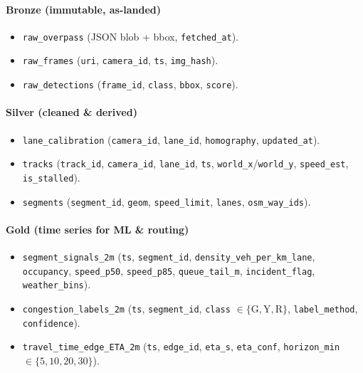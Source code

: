 \paragraph{Bronze (immutable, as-landed)}
\begin{itemize}
  \item \texttt{raw\_overpass} (JSON blob + bbox, \texttt{fetched\_at}).
  \item \texttt{raw\_frames} (\texttt{uri}, \texttt{camera\_id}, \texttt{ts}, \texttt{img\_hash}).
  \item \texttt{raw\_detections} (\texttt{frame\_id}, \texttt{class}, \texttt{bbox}, \texttt{score}).
\end{itemize}

\paragraph{Silver (cleaned \& derived)}
\begin{itemize}
  \item \texttt{lane\_calibration} (\texttt{camera\_id}, \texttt{lane\_id}, \texttt{homography}, \texttt{updated\_at}).
  \item \texttt{tracks} (\texttt{track\_id}, \texttt{camera\_id}, \texttt{lane\_id}, \texttt{ts}, \texttt{world\_x}/\texttt{world\_y}, \texttt{speed\_est}, \texttt{is\_stalled}).
  \item \texttt{segments} (\texttt{segment\_id}, \texttt{geom}, \texttt{speed\_limit}, \texttt{lanes}, \texttt{osm\_way\_ids}).
\end{itemize}

\paragraph{Gold (time series for ML \& routing)}
\begin{itemize}
  \item \texttt{segment\_signals\_2m} (\texttt{ts}, \texttt{segment\_id}, \texttt{density\_veh\_per\_km\_lane}, \texttt{occupancy}, \texttt{speed\_p50}, \texttt{speed\_p85}, \texttt{queue\_tail\_m}, \texttt{incident\_flag}, \texttt{weather\_bins}).
  \item \texttt{congestion\_labels\_2m} (\texttt{ts}, \texttt{segment\_id}, \texttt{class} $\in \{\text{G},\text{Y},\text{R}\}$, \texttt{label\_method}, \texttt{confidence}).
  \item \texttt{travel\_time\_edge\_ETA\_2m} (\texttt{ts}, \texttt{edge\_id}, \texttt{eta\_s}, \texttt{eta\_conf}, \texttt{horizon\_min} $\in \{5,10,20,30\}$).
\end{itemize}

